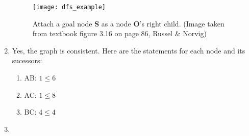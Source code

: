 \documentclass{article}
\begin{document}
\begin{enumerate}
    \begin{figure}[H]
        \centering
        \texttt{[image: dfs\_example]}
        \caption{Attach a goal node \textbf{S} as a node \textbf{O}'s right child. (Image taken from textbook figure 3.16 on page 86, Russel \& Norvig)}
    \end{figure}
    \item Yes, the graph is consistent. Here are the statements for each node and its sucessors:
    \begin{enumerate}
        \item AB: $1 \leq 6$
        \item AC: $1 \leq 8$
        \item BC: $4 \leq 4$
    \end{enumerate}
    \item
\end{enumerate}
\end{document}
